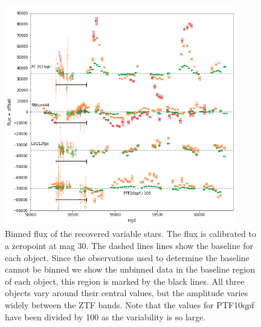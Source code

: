 \documentclass[a4paper,oneside,12pt, class=Latex/Classes/PhDthesisPSnPDF, crop=false]{standalone}
\begin{document}
\begin{figure}[h!]
    \centering
    \includegraphics[width=0.9\textwidth]{../Images/chapter_4/non-transients_varstar.png}
    \caption{Binned flux of the recovered variable stars. The flux is calibrated to a zeropoint at mag 30. The dashed lines lines show the baseline for each object. Since the observations used to determine the baseline cannot be binned we show the unbinned data in the baseline region of each object, this region is marked by the black lines. All three objects vary around their central values, but the amplitude varies widely between the ZTF bands. Note that the values for PTF10qpf have been divided by 100 as the variability is so large.}
    \label{non-transients_varstar}
\end{figure}
\end{document}
